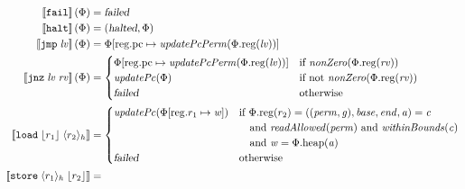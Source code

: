 \documentclass[a4paper]{article}
\newcommand{\update}[2]{[#1 \mapsto #2]}
\newcommand{\sem}[1]{\left\llbracket #1 \right\rrbracket}
\newcommand{\var}[1]{\mathit{#1}}
\newcommand{\rv}{\var{rv}}
\newcommand{\lv}{\var{lv}}
\newcommand{\gl}{\var{g}}
\newcommand{\pcreg}{\mathrm{pc}}
\newcommand{\addr}{\var{a}}
\newcommand{\start}{\var{base}}
\newcommand{\addrend}{\var{end}}
\newcommand{\perm}{\var{perm}}
\newcommand{\stdcap}[1][(\perm,\gl)]{\left(#1,\start,\addrend,\addr \right)}
\newcommand{\plainproj}[1]{\mathrm{#1}}
\newcommand{\memheap}[1][\Phi]{#1.\plainproj{heap}}
\newcommand{\memreg}[1][\Phi]{#1.\plainproj{reg}}
\newcommand{\updateReg}[3][\Phi]{#1\update{\plainproj{reg}.#2}{#3}}
\newcommand{\failed}{\textsl{failed}}
\newcommand{\halted}{\textsl{halted}}
\newcommand{\plainfun}[2]{
  \ifthenelse{\equal{#2}{}}
             {\mathit{#1}}
             {\mathit{#1}(#2)}
}
\newcommand{\updatePcPerm}[1]{\plainfun{updatePcPerm}{#1}}
\newcommand{\nonZero}[1]{\plainfun{nonZero}{#1}}
\newcommand{\readAllowed}[1]{\plainfun{readAllowed}{#1}}
\newcommand{\withinBounds}[1]{\plainfun{withinBounds}{#1}}
\newcommand{\stdUpdatePc}[1]{\plainfun{updatePc}{#1}}
\newcommand{\refreg}[1]{\lfloor #1 \rfloor}
\newcommand{\refheap}[1]{\langle #1 \rangle_h}
\newcommand{\zinstr}[1]{\mathtt{#1}}
\newcommand{\fail}{\zinstr{fail}}
\newcommand{\halt}{\zinstr{halt}}
\newcommand{\oneinstr}[2]{\zinstr{#1} \; #2}
\newcommand{\jmp}[1]{\oneinstr{jmp}{#1}}
\newcommand{\twoinstr}[3]{\zinstr{#1} \; #2 \; #3}
\newcommand{\jnz}[2]{\twoinstr{jnz}{#1}{#2}}
\newcommand{\store}[2]{\twoinstr{store}{#1}{#2}}
\newcommand{\load}[2]{\twoinstr{load}{#1}{#2}}
\begin{document}
\begin{align*}
  \sem{\fail}(\Phi)                        & = \failed \\
  \sem{\halt}(\Phi)                        & = (\halted,\Phi) \\
  \sem{\jmp{\lv}}(\Phi)                    & = \updateReg{\pcreg}{\updatePcPerm{\memreg(\lv)}} \\
  \sem{\jnz{\lv}{\rv}}(\Phi)               & = 
                                             \begin{cases}
                                               \updateReg{\pcreg}{\updatePcPerm{\memreg(\lv)}} &
                                               \arraycolsep=0pt
                                               \begin{array}[t]{l}
                                                 \text{if $\nonZero{\memreg(\rv)}$} 
                                               \end{array}\\
                                               \stdUpdatePc{\Phi} & \text{if not $\nonZero{\memreg(\rv)}$}\\
                                               \failed & \text{otherwise }
                                             \end{cases} \\
 \sem{\load{\refreg{r_1}}{\refheap{r_2}}}  & = 
                                             \begin{cases}
                                               \stdUpdatePc{\updateReg{r_1}{\var{w}}} &
                                               \arraycolsep=0pt
                                               \begin{array}[t]{l}
                                                 \text{if }\memreg(r_2) = \stdcap = \var{c} \\
                                                 \quad\text{and }\readAllowed{\perm} \text{ and } \withinBounds{\var{c}} \\
                                                 \quad\text{and }\var{w} = \memheap(\addr)
                                               \end{array}\\
                                               \failed & \text{otherwise }
                                             \end{cases}\\
 \sem{\store{\refheap{r_1}}{\refreg{r_2}}} & = 

\end{align*}
\end{document}
